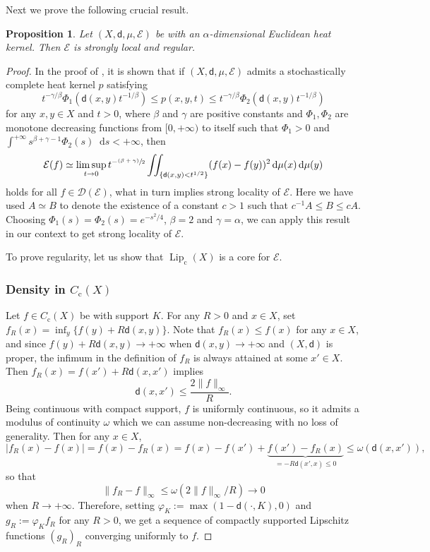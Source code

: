 \documentclass[10pt]{amsart}
\newcommand{\rmc}{\mathrm{c}}
\theoremstyle{plain}
\newtheorem{proposition}[theorem]{Proposition}
\theoremstyle{definition}
\newcommand{\cE}{\mathcal{E}}
\newcommand{\cD}{\mathcal{D}}
\let\phi\varphi
\newcommand{\di}{\mathop{}\!\mathrm{d}}
\DeclareMathOperator{\Lip}{Lip}
\newcommand{\dist}{\mathsf{d}}
\begin{document}
Next we prove the following crucial result.

\begin{proposition}\label{prop:slandreg}
Let $(X,\dist,\mu,\cE)$ be with an $\alpha$-dimensional Euclidean heat kernel. Then $\cE$ is strongly local and regular.
\end{proposition}

\begin{proof}
In the proof of \cite[Th.\,4.1]{Grigor'yan}, it is shown that if $(X,\dist,\mu,\cE)$ admits a stochastically complete heat kernel $p$ satisfying
\[
t^{-\gamma/\beta} \Phi_1(\dist(x,y)t^{-1/\beta})\le p(x,y,t)\le t^{-\gamma/\beta} \Phi_2(\dist(x,y)t^{-1/\beta})
\]
for any $x,y \in X$ and $t>0$, where $\beta$ and $\gamma$ are positive constants and $\Phi_1, \Phi_2$ are monotone decreasing functions from $[0,+\infty)$ to itself such that $\Phi_1>0$ and $\int^{+\infty}s^{\beta + \gamma-1}\Phi_2(s)\di s<+\infty$, then
\begin{equation}\label{eq:Grigor'yan}
\cE(f) \simeq \limsup_{t\to 0} t^{-\sfrac{(\beta + \gamma)}{2}} \iint_{\{\dist(x,y)<t^{1/2}\}}(f(x)-f(y))^2\di \mu(x)\di \mu(y)
\end{equation}
holds for all $f \in \cD(\cE)$, what in turn implies strong locality of $\cE$. Here we have used $A\simeq B$ to denote the existence of a constant $c>1$ such that $c^{-1}A\le B \le cA$. Choosing $\Phi_1(s)=\Phi_2(s)=e^{-s^2/4}$, $\beta=2$ and $\gamma = \alpha$, we can apply this result in our context to get strong locality of $\cE$.

To prove regularity, let us show that $\Lip_\rmc(X)$ is a core for $\cE$.

\subsubsection*{Density in $C_\rmc(X)$} Let $f \in C_\rmc(X)$ be with support $K$. For any $R>0$ and $x \in X$, set $f_R(x)=\inf_y \{f(y)+R\dist(x,y)\}$. Note that $f_R(x)\le f(x)$ for any $x \in X$, and since $f(y)+R\dist(x,y)\to +\infty$ when $\dist(x,y) \to +\infty$ and $(X,\dist)$ is proper, the infimum in the definition of $f_R$ is always attained at some $x' \in X$. Then $f_R(x)=f(x')+R\dist(x,x')$ implies
\[
\dist(x,x') \le \frac{2\|f\|_{\infty}}{R}.
\]
Being continuous with compact support, $f$ is uniformly continuous, so it admits a modulus of continuity $\omega$ which we can assume non-decreasing with no loss of generality.
Then for any $x \in X$,
\[
|f_R(x)-f(x)|=f(x)-f_R(x)=f(x)-f(x')+\underbrace{f(x')-f_R(x)}_{=-R\dist(x',x)\le 0} \le \omega(\dist(x,x')),
\]
so that
\[
\|f_R-f\|_{\infty} \le \omega\left(2 \|f\|_{\infty}/R\right) \to 0
\]
when $R \to +\infty$. Therefore, setting $\phi_K:=\max(1-\dist(\cdot,K),0)$ and $g_R:=\phi_K f_R$ for any $R>0$, we get a sequence of compactly supported Lipschitz functions $(g_R)_R$ converging uniformly to $f$.


\end{proof}
\end{document}
